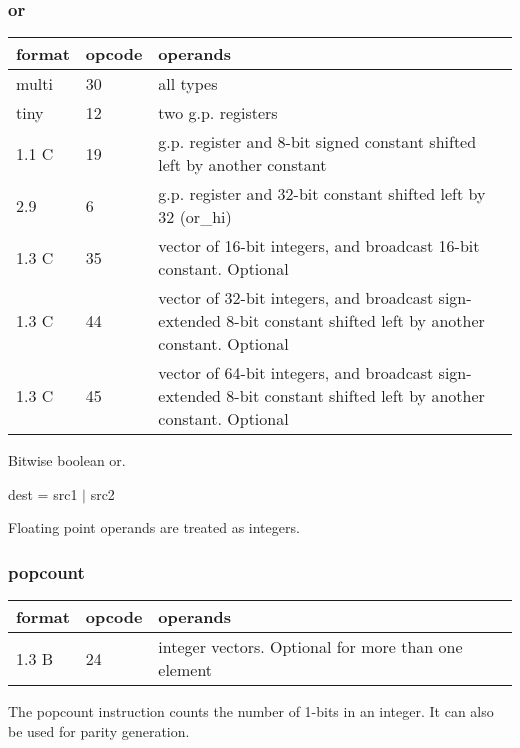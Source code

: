 \documentclass[forwardcom.tex]{subfiles}
\begin{document}
\subsubsection{or}
\label{table:orInstruction}
\begin{tabular}{|p{12mm}|p{12mm}|p{110mm}|}
\hline
\bfseries format & \bfseries opcode & \bfseries operands \\ \hline
multi & 30 & all types \\ \hline
tiny  & 12 & two g.p. registers \\ \hline
1.1 C & 19 & g.p. register and 8-bit signed constant shifted left by another constant \\ \hline
2.9   &  6 & g.p. register and 32-bit constant shifted left by 32 (or\_hi) \\ \hline
1.3 C & 35 & vector of 16-bit integers, and broadcast 16-bit constant. Optional \\ \hline
1.3 C & 44 & vector of 32-bit integers, and broadcast sign-extended 8-bit constant shifted left by another constant. Optional \\ \hline
1.3 C & 45 & vector of 64-bit integers, and broadcast sign-extended 8-bit constant shifted left by another constant. Optional \\ \hline
\end{tabular}
\vspace{2mm}

Bitwise boolean or.
\vspace{2mm}

dest = src1 $|$ src2
\vspace{2mm}

Floating point operands are treated as integers.

\subsubsection{popcount}
\label{table:popcountInstruction}
\begin{tabular}{|p{12mm}|p{12mm}|p{110mm}|}
\hline
\bfseries format & \bfseries opcode & \bfseries operands \\ \hline
1.3 B & 24 & integer vectors. Optional for more than one element \\ \hline
\end{tabular}
\vspace{2mm}

The popcount instruction counts the number of 1-bits in an integer. It can also be used for parity generation.
\end{document}
